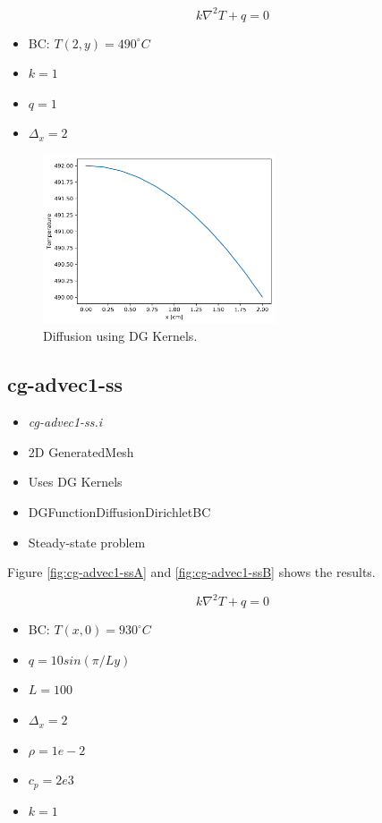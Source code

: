 \documentclass[11pt,letterpaper]{article}
\begin{document}
	\begin{equation}
    	k \nabla^2 T + q = 0
	\end{equation}

	\begin{itemize}
		\item BC: $T(2, y) = 490^{\circ}C$
		\item $k = 1$
		\item $q = 1$
		\item $\Delta_x = 2$
	\end{itemize}

	\begin{figure}[htbp!]
		\centering
		\includegraphics[height=5cm]{diff1-ss_across}
		\caption{Diffusion using DG Kernels.}
		\label{fig:diff1-ss}
	\end{figure}

	\subsection{cg-advec1-ss}

	\begin{itemize}
		\item \textit{cg-advec1-ss.i}
		\item 2D GeneratedMesh
		\item Uses DG Kernels
		\item DGFunctionDiffusionDirichletBC
		\item Steady-state problem
	\end{itemize}

    Figure \ref{fig:cg-advec1-ssA} and \ref{fig:cg-advec1-ssB} shows the results.

	\begin{equation}
    	k \nabla^2 T + q = 0
	\end{equation}

	\begin{itemize}
		\item BC: $T(x, 0) = 930^{\circ}C$
		\item $q = 10 sin (\pi/L y)$
		\item $L = 100$
		\item $\Delta_x = 2$
		\item $\rho = 1e-2$
		\item $c_p = 2e3$
		\item $k = 1$
	\end{itemize}
\end{document}
